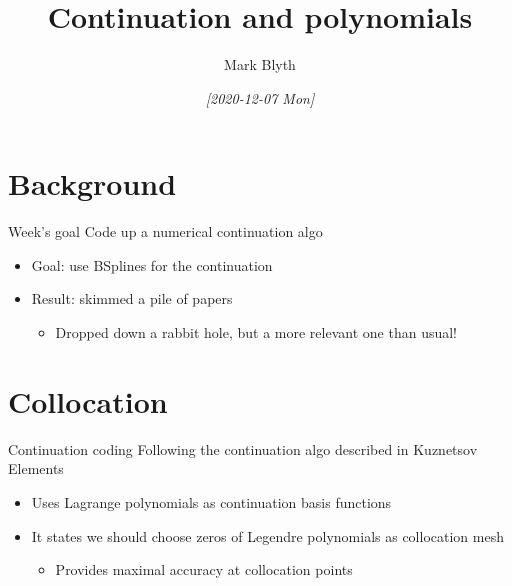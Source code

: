 \documentclass[presentation]{beamer}
\author{Mark Blyth}
\date{\textit{[2020-12-07 Mon]}}
\title{Continuation and polynomials}
\begin{document}
\maketitle

\section{Background}
\label{sec:org352cf30}
\begin{frame}[label={sec:orga372be9}]{Week's goal}
Code up a numerical continuation algo
\vfill
\begin{itemize}
\item Goal: use BSplines for the continuation
\end{itemize}
\vfill
\begin{itemize}
\item Result: skimmed a pile of papers
\begin{itemize}
\item Dropped down a rabbit hole, but a more relevant one than usual!
\end{itemize}
\end{itemize}
\end{frame}

\section{Collocation}
\label{sec:orga5b9df8}
\begin{frame}[label={sec:org0c1eef3}]{Continuation coding}
Following the continuation algo described in Kuznetsov Elements
\vfill
\begin{itemize}
\item Uses Lagrange polynomials as continuation basis functions
\item It states we should choose zeros of Legendre polynomials as collocation mesh
\begin{itemize}
\item Provides maximal accuracy at collocation points
\end{itemize}
\end{itemize}
\end{frame}
\end{document}
